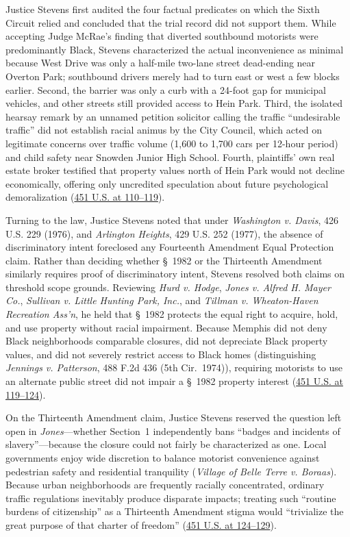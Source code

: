 \documentclass[12pt]{article}
\begin{document}
Justice Stevens first audited the four factual predicates on which the Sixth Circuit relied and concluded that the trial record did not support them. While accepting Judge McRae's finding that diverted southbound motorists were predominantly Black, Stevens characterized the actual inconvenience as minimal because West Drive was only a half-mile two-lane street dead-ending near Overton Park; southbound drivers merely had to turn east or west a few blocks earlier. Second, the barrier was only a curb with a 24-foot gap for municipal vehicles, and other streets still provided access to Hein Park. Third, the isolated hearsay remark by an unnamed petition solicitor calling the traffic ``undesirable traffic'' did not establish racial animus by the City Council, which acted on legitimate concerns over traffic volume (1,600 to 1,700 cars per 12-hour period) and child safety near Snowden Junior High School. Fourth, plaintiffs' own real estate broker testified that property values north of Hein Park would not decline economically, offering only uncredited speculation about future psychological demoralization (\href{https://supreme.justia.com/cases/federal/us/451/100/}{451 U.S. at 110--119}).

Turning to the law, Justice Stevens noted that under \textit{Washington v. Davis}, 426 U.S. 229 (1976), and \textit{Arlington Heights}, 429 U.S. 252 (1977), the absence of discriminatory intent foreclosed any Fourteenth Amendment Equal Protection claim. Rather than deciding whether \S~1982 or the Thirteenth Amendment similarly requires proof of discriminatory intent, Stevens resolved both claims on threshold scope grounds. Reviewing \textit{Hurd v. Hodge}, \textit{Jones v. Alfred H. Mayer Co.}, \textit{Sullivan v. Little Hunting Park, Inc.}, and \textit{Tillman v. Wheaton-Haven Recreation Ass'n}, he held that \S~1982 protects the equal right to acquire, hold, and use property without racial impairment. Because Memphis did not deny Black neighborhoods comparable closures, did not depreciate Black property values, and did not severely restrict access to Black homes (distinguishing \textit{Jennings v. Patterson}, 488 F.2d 436 (5th Cir.\ 1974)), requiring motorists to use an alternate public street did not impair a \S~1982 property interest (\href{https://supreme.justia.com/cases/federal/us/451/100/}{451 U.S. at 119--124}).

On the Thirteenth Amendment claim, Justice Stevens reserved the question left open in \textit{Jones}---whether Section~1 independently bans ``badges and incidents of slavery''---because the closure could not fairly be characterized as one. Local governments enjoy wide discretion to balance motorist convenience against pedestrian safety and residential tranquility (\textit{Village of Belle Terre v. Boraas}). Because urban neighborhoods are frequently racially concentrated, ordinary traffic regulations inevitably produce disparate impacts; treating such ``routine burdens of citizenship'' as a Thirteenth Amendment stigma would ``trivialize the great purpose of that charter of freedom'' (\href{https://supreme.justia.com/cases/federal/us/451/100/}{451 U.S. at 124--129}).
\end{document}
